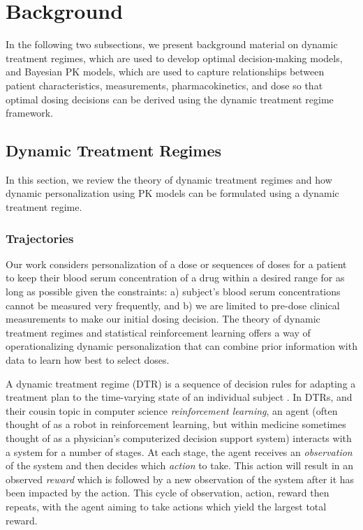 \section{Background}\label{ss:background}

In the following two subsections, we present background material on dynamic treatment regimes, which are used to develop optimal decision-making models, and Bayesian PK models, which are used to capture relationships between patient characteristics, measurements, pharmacokinetics, and dose so that optimal dosing decisions can be derived using the dynamic treatment regime framework.

\subsection{Dynamic Treatment Regimes}

In this section, we review the theory of dynamic treatment regimes and how dynamic personalization using PK models can be formulated using a dynamic treatment regime.

\subsubsection{Trajectories}

Our work considers personalization of a dose or sequences of doses for a patient to keep their blood serum concentration of a drug within a desired range for as long as possible given the constraints: a) subject’s blood serum concentrations cannot be measured very frequently, and b) we are limited to pre-dose clinical measurements to make our initial dosing decision.  The theory of dynamic treatment regimes and statistical reinforcement learning offers a way of operationalizing dynamic personalization that can combine prior information with data to learn how best to select doses.

A dynamic treatment regime (DTR) is a sequence of decision rules for adapting a treatment plan to the time-varying state of an individual subject \cite{chakraborty2013statistical}. In DTRs, and their cousin topic in computer science \textit{reinforcement learning}, an agent (often thought of as a robot in reinforcement learning, but within medicine sometimes thought of as a physician’s computerized decision support system) interacts with a system for a number of stages. At each stage, the agent receives an \textit{observation} of the system and then decides which \textit{action} to take.  This action will result in an observed \textit{reward} which is followed by a new observation of the system after it has been impacted by the action.  This cycle of observation, action, reward then repeats, with the agent aiming to take actions which yield the largest total reward.

